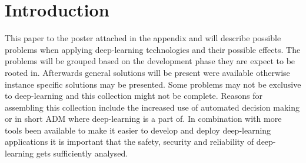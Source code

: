 \section{Introduction}

This paper to the poster attached in the appendix and will describe possible problems when applying deep-learning technologies and their possible effects. The problems will be grouped based on the development phase they are expect to be rooted in. Afterwards general solutions will be present were available otherwise instance specific solutions may be presented. Some problems may not be exclusive to deep-learning and this collection might not be complete. Reasons for assembling this collection include the increased use of automated decision making or in short ADM where deep-learning is a part of. In combination with more tools been available to make it easier to develop and deploy deep-learning applications it is important that the safety, security and reliability of deep-learning gets sufficiently analysed.